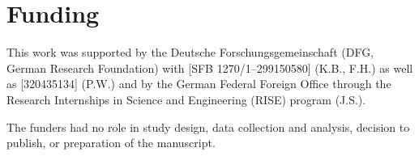 \documentclass[10pt,letterpaper]{article}
\begin{document}
\section*{Funding}
This work was supported by the Deutsche Forschungsgemeinschaft (DFG, German Research Foundation) with [SFB 1270/1--299150580] (K.B., F.H.) as well as [320435134] (P.W.) and by the German Federal Foreign Office through the Research Internships in Science and Engineering (RISE) program (J.S.).

The funders had no role in study design, data collection and analysis, decision to publish, or preparation of the manuscript.


\nolinenumbers




\end{document}
